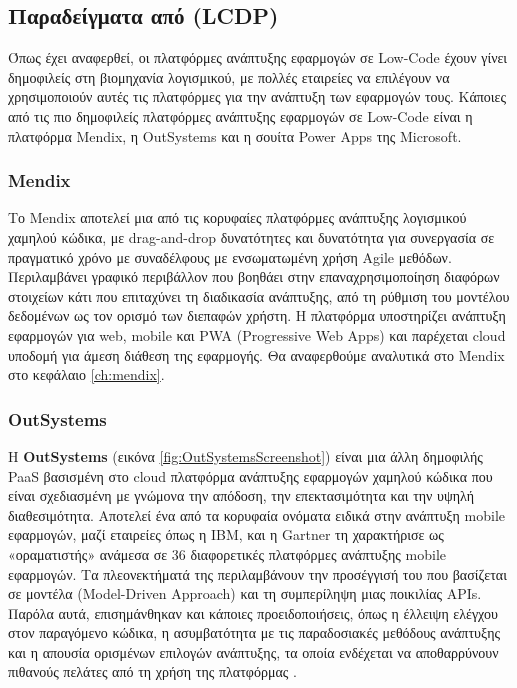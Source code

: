         \subsection{Παραδείγματα από (LCDP)}
            Όπως έχει αναφερθεί, οι πλατφόρμες ανάπτυξης εφαρμογών σε Low-Code έχουν γίνει δημοφιλείς στη βιομηχανία λογισμικού, με πολλές εταιρείες να επιλέγουν να χρησιμοποιούν αυτές τις πλατφόρμες για την ανάπτυξη των εφαρμογών τους. Κάποιες από τις πιο δημοφιλείς πλατφόρμες ανάπτυξης εφαρμογών σε Low-Code είναι η πλατφόρμα Mendix, η OutSystems και η σουίτα Power Apps της Microsoft.

            \subsubsection{Mendix}
            Το Mendix αποτελεί μια από τις κορυφαίες πλατφόρμες ανάπτυξης λογισμικού χαμηλού κώδικα, με drag-and-drop δυνατότητες και δυνατότητα για συνεργασία σε πραγματικό χρόνο με συναδέλφους με ενσωματωμένη χρήση Agile μεθόδων. Περιλαμβάνει γραφικό περιβάλλον που βοηθάει στην επαναχρησιμοποίηση διαφόρων στοιχείων κάτι που επιταχύνει τη διαδικασία ανάπτυξης, από τη ρύθμιση του μοντέλου δεδομένων ως τον ορισμό των διεπαφών χρήστη. Η πλατφόρμα υποστηρίζει ανάπτυξη εφαρμογών για web, mobile και PWA (Progressive Web Apps) και παρέχεται cloud υποδομή για άμεση διάθεση της εφαρμογής. Θα αναφερθούμε αναλυτικά στο Mendix στο κεφάλαιο \ref{ch:mendix}.

            \subsubsection{OutSystems}
            Η \textbf{OutSystems} (εικόνα \ref{fig:OutSystemsScreenshot}) είναι μια άλλη δημοφιλής PaaS βασισμένη στο cloud πλατφόρμα ανάπτυξης εφαρμογών χαμηλού κώδικα που είναι σχεδιασμένη με γνώμονα την απόδοση, την επεκτασιμότητα και την υψηλή διαθεσιμότητα. Αποτελεί ένα από τα κορυφαία ονόματα ειδικά στην ανάπτυξη mobile εφαρμογών, μαζί εταιρείες όπως η IBM, και η Gartner τη χαρακτήρισε ως «οραματιστής» ανάμεσα σε 36 διαφορετικές πλατφόρμες ανάπτυξης mobile εφαρμογών. Τα πλεονεκτήματά της περιλαμβάνουν την προσέγγισή του που βασίζεται σε μοντέλα (Model-Driven Approach) και τη συμπερίληψη μιας ποικιλίας APIs. Παρόλα αυτά, επισημάνθηκαν και κάποιες προειδοποιήσεις, όπως η έλλειψη ελέγχου στον παραγόμενο κώδικα, η ασυμβατότητα με τις παραδοσιακές μεθόδους ανάπτυξης και η απουσία ορισμένων επιλογών ανάπτυξης, τα οποία ενδέχεται να αποθαρρύνουν πιθανούς πελάτες από τη χρήση της πλατφόρμας \cite{QuadrantOutSystems}.

